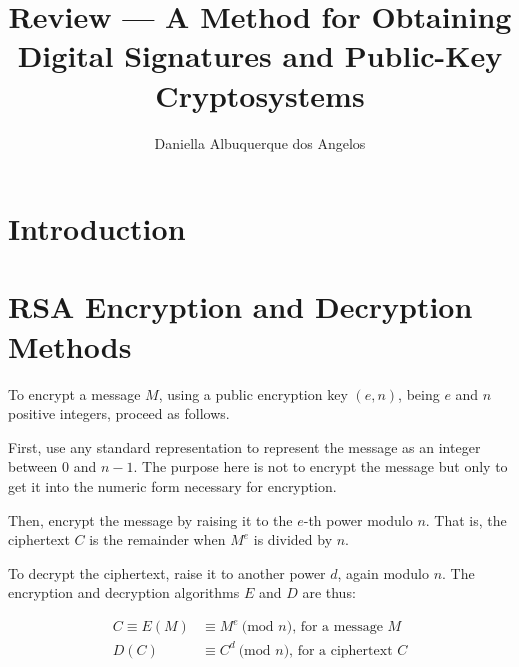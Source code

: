 \documentclass{llncs}
\begin{document}
\mainmatter%
%
\title{Review --- A Method for Obtaining Digital Signatures and Public-Key Cryptosystems}
%
%
\author{Daniella Albuquerque dos Angelos}
%
%

\maketitle              %

\begin{abstract}
\end{abstract}
%
\section{Introduction}
\label{intro}



\section{RSA Encryption and Decryption Methods}
\label{rsa}

To encrypt a message $M$, using a public encryption key $(e, n)$, being $e$ and
$n$ positive integers, proceed as follows.

First, use any standard representation to represent the message as an integer
between 0 and $n - 1$. The purpose here is not to encrypt the message but only
to get it into the numeric form necessary for encryption.

Then, encrypt the message by raising it to the $e$-th power modulo $n$. That is,
the ciphertext $C$ is the remainder when $M^e$ is divided by $n$.

To decrypt the ciphertext, raise it to another power $d$, again modulo $n$. The
encryption and decryption algorithms $E$ and $D$ are thus:

\begin{align*}
    C \equiv  E(M) & \equiv M^e\ \text{(mod $n$), for a message $M$}\\
     D(C) & \equiv  C^d\ \text{(mod $n$), for a ciphertext $C$}
\end{align*}
\end{document}
